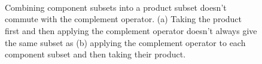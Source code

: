 \documentclass[
  letterpaper,
  DIV=11,
  numbers=noendperiod]{scrartcl}
\begin{document}
\begin{figure}
\begin{minipage}[t]{0.10\linewidth}
{~

}

\end{minipage}%
\newline
\begin{minipage}[t]{0.10\linewidth}

{\centering 

~

}

\end{minipage}%
%
\begin{minipage}[t]{0.80\linewidth}

{\centering 


}

\subcaption{\label{fig-cp}}
\end{minipage}%
%
\begin{minipage}[t]{0.10\linewidth}

{\centering 

~

}

\end{minipage}%

\caption{\label{fig-product-set-complement}Combining component subsets
into a product subset doesn't commute with the complement operator. (a)
Taking the product first and then applying the complement operator
doesn't always give the same subset as (b) applying the complement
operator to each component subset and then taking their product.}

\end{figure}
\end{document}
